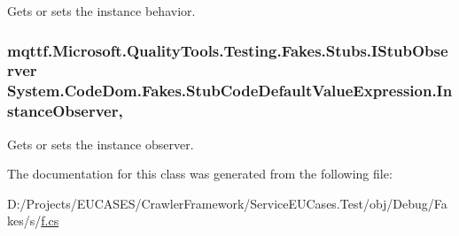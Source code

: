 Gets or sets the instance behavior.

\hypertarget{class_system_1_1_code_dom_1_1_fakes_1_1_stub_code_default_value_expression_ab5fa985309ec609b92cec8325cb3ca22}{
\subsubsection[{Instance\-Observer}]{\setlength{\rightskip}{0pt plus 5cm}mqttf.\-Microsoft.\-Quality\-Tools.\-Testing.\-Fakes.\-Stubs.\-I\-Stub\-Observer System.\-Code\-Dom.\-Fakes.\-Stub\-Code\-Default\-Value\-Expression.\-Instance\-Observer\hspace{0.3cm}{\ttfamily [get]}, {\ttfamily [set]}}}\label{class_system_1_1_code_dom_1_1_fakes_1_1_stub_code_default_value_expression_ab5fa985309ec609b92cec8325cb3ca22}


Gets or sets the instance observer.



The documentation for this class was generated from the following file\-:\begin{DoxyCompactItemize}
\item 
D\-:/\-Projects/\-E\-U\-C\-A\-S\-E\-S/\-Crawler\-Framework/\-Service\-E\-U\-Cases.\-Test/obj/\-Debug/\-Fakes/s/\hyperlink{s_2f_8cs}{f.\-cs}\end{DoxyCompactItemize}
